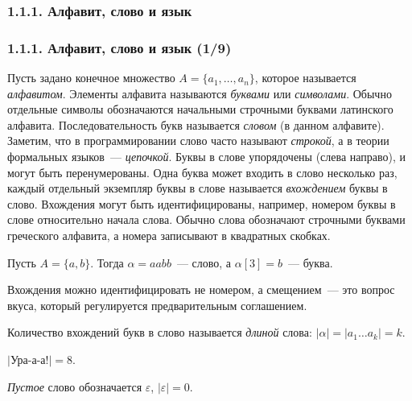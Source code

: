 \documentclass[mathserif,12pt,aspectratio=169]{beamer}
\renewcommand{\index}[1]{}
\def\odmkey#1#2{{\it\color{red} #1}\index{#2}}
\def\Tuple#1#2#3{{#1}_{#2},\dots,{#1}_{#3}}
\begin{document}
\subsubsection{1.1.1. Алфавит, слово и язык}\label{1.1.1}
\begin{frame}
\frametitle{1.1.1. Алфавит, слово и язык (1/9)}
Пусть задано конечное множество $A =\{\Tuple{a}{1}{n}\}$, которое
называется \odmkey{алфавитом}{Алфавит}. Элементы алфавита называются
\odmkey{буквами}{Буква} или \odmkey{символами}{Символ}.
Обычно отдельные символы обозначаются
начальными строчными буквами латинского алфавита.
Последовательность букв называется
\odmkey{словом}{Слово} (в данном алфавите).
Заметим, что в программировании слово часто называют
\odmkey{строкой}{Строка}, а в теории формальных языков~--- \odmkey{цепочкой}{Цепочка}.
Буквы в слове упорядочены (слева направо),
и могут быть перенумерованы.
Одна буква может входить
в слово несколько раз, каждый
отдельный экземпляр буквы в слове называется
\odmkey{вхождением}{Вхождение} буквы в слово.
Вхождения могут быть идентифицированы,
например, номером буквы в слове 
 относительно начала слова.
Обычно слова обозначают
строчными буквами греческого алфавита,
а номера записывают в квадратных скобках.
\begin{example}
Пусть $A=\{a,b\}$. Тогда 
$\alpha=aabb$~--- слово, 
а $\alpha[3]=b$~--- буква.
\end{example}

\begin{remark}
Вхождения можно идентифицировать не номером,
а смещением~--- это вопрос вкуса, который регулируется предварительным соглашением.
\end{remark}

Количество вхождений букв в слово называется \odmkey{длиной}{Длина!слова} слова:
$|\alpha| = |a_1\dots a_k| = k$.
\begin{example} $|$Ура-а-а!$| = 8$.
\end{example}

\odmkey{Пустое}{Слово!пустое} слово обозначается
$\varepsilon$,
$|\varepsilon|= 0$.

\end{frame}
\end{document}
